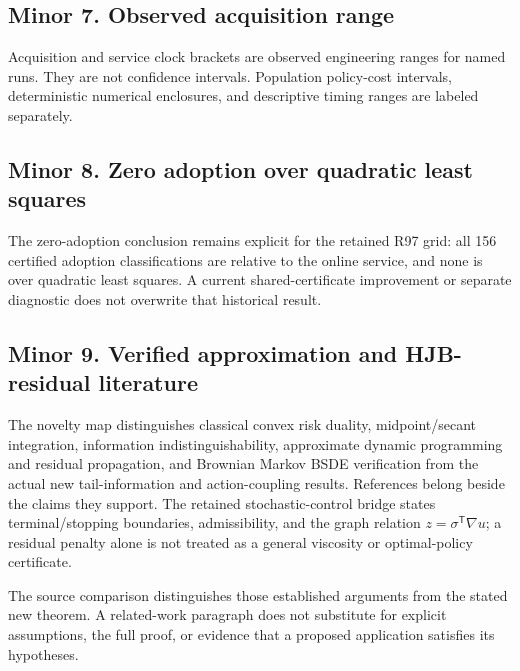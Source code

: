 \hypertarget{minor-7.-observed-acquisition-range}{%
\subsection{Minor 7. Observed acquisition range}\label{minor-7.-observed-acquisition-range}}

Acquisition and service clock brackets are observed engineering ranges for named runs. They are not confidence intervals. Population policy-cost intervals, deterministic numerical enclosures, and descriptive timing ranges are labeled separately.

\hypertarget{minor-8.-zero-adoption-over-quadratic-least-squares}{%
\subsection{Minor 8. Zero adoption over quadratic least squares}\label{minor-8.-zero-adoption-over-quadratic-least-squares}}

The zero-adoption conclusion remains explicit for the retained R97 grid: all 156 certified adoption classifications are relative to the online service, and none is over quadratic least squares. A current shared-certificate improvement or separate diagnostic does not overwrite that historical result.

\hypertarget{minor-9.-verified-approximation-and-hjb-residual-literature}{%
\subsection{Minor 9. Verified approximation and HJB-residual literature}\label{minor-9.-verified-approximation-and-hjb-residual-literature}}

The novelty map distinguishes classical convex risk duality, midpoint/secant integration, information indistinguishability, approximate dynamic programming and residual propagation, and Brownian Markov BSDE verification from the actual new tail-information and action-coupling results. References belong beside the claims they support. The retained stochastic-control bridge states terminal/stopping boundaries, admissibility, and the graph relation \(z=\sigma^{\mathsf T}\nabla u\); a residual penalty alone is not treated as a general viscosity or optimal-policy certificate.

The source comparison distinguishes those established arguments from the stated new theorem. A related-work paragraph does not substitute for explicit assumptions, the full proof, or evidence that a proposed application satisfies its hypotheses.


